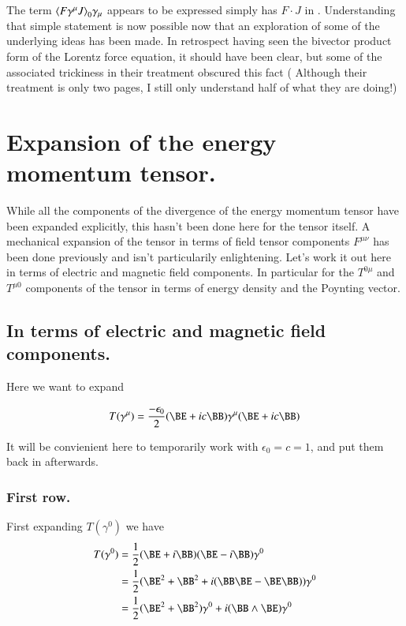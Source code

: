 \documentclass{article}
\begin{document}
The term ${\left\langle{{ F \gamma^\mu J }}\right\rangle}_{0} \gamma_\mu $ appears to be expressed simply has $F \cdot J$ in
\cite{doran2003gap}.  Understanding that simple statement is now possible now that an exploration
of some of the underlying ideas has been made.  In retrospect having seen the bivector product form of the Lorentz force equation, it should have been 
clear, but some of the associated trickiness in their treatment obscured this
fact ( Although their treatment is only two pages, I still only 
understand half of what they are doing!)


\section{ Expansion of the energy momentum tensor. }

While all the components of the divergence of the energy momentum tensor have been expanded explicitly, this hasn't been
done here for the tensor itself.  A mechanical expansion of the tensor in terms of field tensor components $F^{\mu\nu}$ has been 
done previously and isn't particularily enlightening.  Let's work it out here in terms of electric and magnetic field components.  In particular for the $T^{0\mu}$ and $T^{\mu0}$ components of the tensor in terms of energy density and the Poynting vector.

\subsection{ In terms of electric and magnetic field components. }

Here we want to expand 

\begin{align*}
T(\gamma^\mu) = \frac{-\epsilon_0}{2} (\BE + i c \BB) \gamma^\mu (\BE + i c \BB)
\end{align*}

It will be convienient here to temporarily work with $\epsilon_0 = c = 1$, and put them back in afterwards.

\subsubsection{ First row. } 

First expanding $T(\gamma^0)$ we have
\begin{align*}
T(\gamma^0) 
&= \frac{1}{2} (\BE + i \BB) (\BE - i \BB) \gamma^0 \\
&= \frac{1}{2} (\BE^2 + \BB^2 + i (\BB \BE - \BE \BB)) \gamma^0 \\
&= \frac{1}{2} (\BE^2 + \BB^2) \gamma^0 + i ( \BB \wedge \BE ) \gamma^0 \\
\end{align*}
\end{document}

